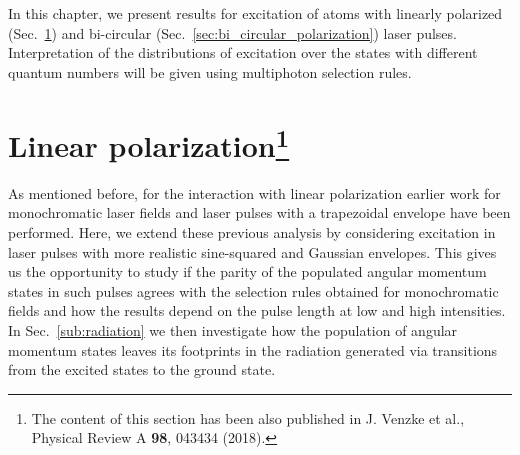 In this chapter, we present results for excitation of atoms with linearly polarized (Sec.~\ref{sec:linear_polarization}) and bi-circular (Sec.~\ref{sec:bi_circular_polarization}) laser pulses. Interpretation of the distributions of excitation over the states with different quantum numbers will be given using multiphoton selection rules. 



\section[Linear polarization]{Linear polarization\protect\footnote{The content of this section has been also published in J. Venzke et al., Physical Review A \textbf{98}, 043434 (2018).}} %
\label{sec:linear_polarization}

As mentioned before, for the interaction with linear polarization earlier work for monochromatic laser fields and laser pulses with a trapezoidal envelope have been performed. Here, we extend these previous analysis by considering excitation in laser pulses with more realistic sine-squared and Gaussian envelopes. This gives us the opportunity to study if the parity of the populated angular momentum states in such pulses agrees with the selection rules obtained for monochromatic fields and how the results depend on the pulse length at low and high intensities. In Sec.~\ref{sub:radiation} we then investigate how the population of angular momentum states leaves its footprints in the radiation generated via transitions from the excited states to the ground state. 

